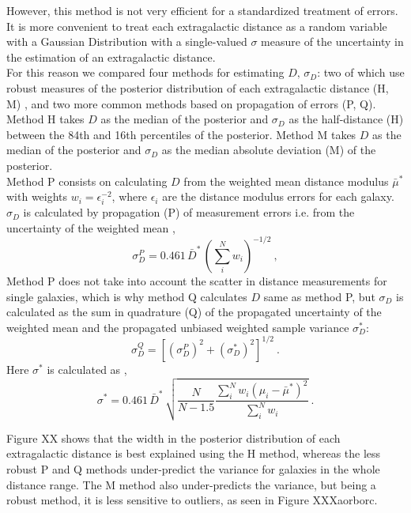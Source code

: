\documentclass[a4paper,fleqn,usenatbib]{mnras}
\begin{document}
However, this method is not very efficient for a standardized treatment of errors. It is more convenient to treat each extragalactic distance as a random variable with a Gaussian Distribution with a single-valued  $\sigma$ measure of the uncertainty in the estimation of an extragalactic distance.\\
 
 For this reason we compared four methods for estimating $D,\,\sigma_D$: two of which use robust measures of the posterior distribution of each extragalactic distance (H, M) , and two more common methods based on propagation of errors (P, Q). Method H takes $D$ as the median of the posterior and $\sigma_D$ as the half-distance (H) between the 84th and 16th percentiles of the posterior. Method M takes $D$ as the median of the posterior and $\sigma_D$ as the median absolute deviation (M) of the posterior.\\
 
Method P consists on calculating $D$ from the weighted mean distance modulus $\bar{\mu}^*$ with weights $w_i=\epsilon_i^{-2}$, where $\epsilon_i$ are the distance modulus errors for each galaxy. $\sigma_D$ is calculated by propagation (P) of measurement errors  i.e. from the uncertainty of the weighted mean \citep{cosmicflows},
\begin{equation}
\sigma_D^P=0.461\,\bar{D}^*\,\left(\sum_i^Nw_i\right)^{-1/2} \ ,
\end{equation}
Method P does not take into account the scatter in distance measurements for single galaxies, which is why method Q calculates $D$ same as method P, but $\sigma_D$ is calculated as the sum in quadrature (Q) of the propagated uncertainty of the weighted mean and the propagated unbiased weighted sample variance $\sigma_D^*$:
\begin{equation}
\sigma_D^Q=\left[ \left(\sigma_D^P\right)^2+\left(\sigma_D^*\right)^2\right]^{1/2} \ .
\end{equation}
Here $\sigma^*$ is calculated as  \citep{wstdev},
\begin{equation}
\sigma^*=0.461\,\bar{D}^*\,\sqrt{\frac{N}{N-1.5}\frac{\sum_i^Nw_i(\mu_i-\bar{\mu}^*)^2}{\sum_i^Nw_i}}\ .
\end{equation}


Figure XX shows that the width in the posterior distribution of each extragalactic distance is best explained using the H method, whereas the less robust P and Q methods under-predict the variance for galaxies in the whole distance range. The M method also under-predicts the variance, but being a robust method, it is less sensitive to outliers, as seen in Figure XXXaorborc.\\
\end{document}
